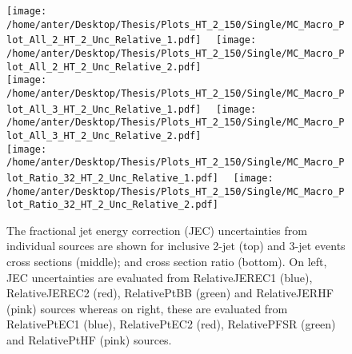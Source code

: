 \begin{figure}[!hbtp]
\hspace*{-5mm}\texttt{[image: /home/anter/Desktop/Thesis/Plots\_HT\_2\_150/Single/MC\_Macro\_Plot\_All\_2\_HT\_2\_Unc\_Relative\_1.pdf]}%
~~\texttt{[image: /home/anter/Desktop/Thesis/Plots\_HT\_2\_150/Single/MC\_Macro\_Plot\_All\_2\_HT\_2\_Unc\_Relative\_2.pdf]}\\
\hspace*{-5mm}\texttt{[image: /home/anter/Desktop/Thesis/Plots\_HT\_2\_150/Single/MC\_Macro\_Plot\_All\_3\_HT\_2\_Unc\_Relative\_1.pdf]}%
~~\texttt{[image: /home/anter/Desktop/Thesis/Plots\_HT\_2\_150/Single/MC\_Macro\_Plot\_All\_3\_HT\_2\_Unc\_Relative\_2.pdf]}\\
\hspace*{-5mm}\texttt{[image: /home/anter/Desktop/Thesis/Plots\_HT\_2\_150/Single/MC\_Macro\_Plot\_Ratio\_32\_HT\_2\_Unc\_Relative\_1.pdf]}%
~~\texttt{[image: /home/anter/Desktop/Thesis/Plots\_HT\_2\_150/Single/MC\_Macro\_Plot\_Ratio\_32\_HT\_2\_Unc\_Relative\_2.pdf]}
\caption{The fractional jet energy correction (JEC) uncertainties from individual sources are shown for inclusive 2-jet (top) and 3-jet events cross sections (middle); and cross section ratio \ratio (bottom). On left, JEC uncertainties are evaluated from RelativeJEREC1 (blue), RelativeJEREC2 (red), RelativePtBB (green) and RelativeJERHF (pink) sources whereas on right, these are evaluated from RelativePtEC1 (blue), RelativePtEC2 (red), RelativePFSR (green) and RelativePtHF (pink) sources.}
\label{fig:jes2}
\end{figure}

